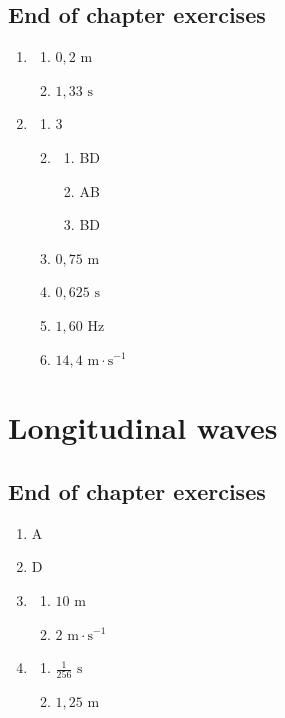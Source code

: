\subsection{End of chapter exercises} 
\begin{multicols}{4}
\begin{enumerate}[noitemsep, label=\textbf{\arabic*}. ] 
\item %
 \begin{enumerate}[noitemsep, label=\textbf{(\alph*)} ]
\item $0,2 \text{ m}$
\item $1,33 \text{ s}$
\end{enumerate}
\item %
 \begin{enumerate}[noitemsep, label=\textbf{(\alph*)} ]
\item $3$
\item 
\begin{enumerate}[noitemsep, label=\textbf{(\roman*)} ]
\item BD
\item AB
\item BD
\end{enumerate}
\item $0,75 \text{ m}$
\item $0,625 \text{ s}$
\item $1,60 \text{ Hz}$
\item $14,4 \text{ m} \cdot \text{s}^{-1}$
\end{enumerate}
\end{enumerate}
\end{multicols}
\section{Longitudinal waves}
\subsection{End of chapter exercises} 
\begin{multicols}{3}
  \begin{enumerate}[noitemsep, label=\textbf{\arabic*}.]
  \item %
A
  \item %
D
  \item %
\begin{enumerate}[noitemsep, label=\textbf{\alph*}.]
 \item $10 \text{ m}$
\item $2 \text{ m} \cdot \text{s}^{-1}$
\end{enumerate} 
  \item %
\begin{enumerate}[noitemsep, label=\textbf{\alph*}.]
 \item $\frac{1}{256} \text{ s}$
\item $1,25 \text{ m}$
\end{enumerate}
  \end{enumerate}
\end{multicols}
